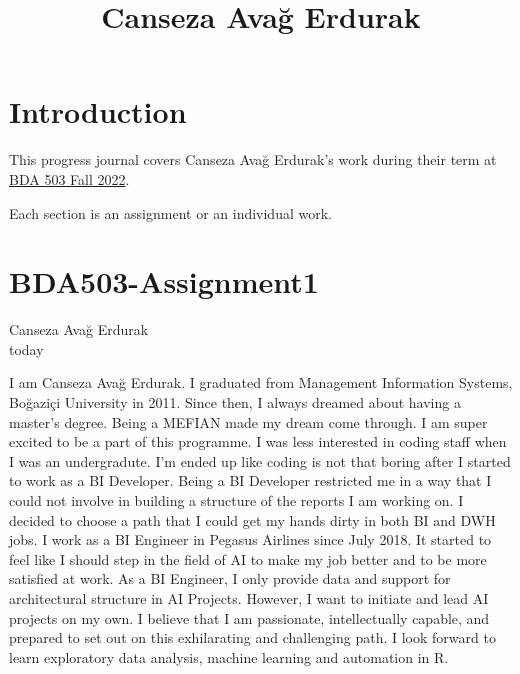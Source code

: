 \documentclass[
  letterpaper,
  DIV=11,
  numbers=noendperiod]{scrreprt}
\title{Canseza Avağ Erdurak}
\author{}
\date{}
\renewcommand*\contentsname{Table of contents}
\newcommand\contentsname{Table of contents}
\begin{document}
\maketitle
\ifdefined\Shaded\renewenvironment{Shaded}{\begin{tcolorbox}[borderline west={3pt}{0pt}{shadecolor}, boxrule=0pt, interior hidden, enhanced, breakable, frame hidden, sharp corners]}{\end{tcolorbox}}\fi

\renewcommand*\contentsname{Table of contents}
{
\hypersetup{linkcolor=}
\setcounter{tocdepth}{2}
\tableofcontents
}

\hypertarget{introduction}{%
\chapter*{Introduction}\label{introduction}}

This progress journal covers Canseza Avağ Erdurak's work during their
term at \href{https://mef-bda503.github.io/fall22/}{BDA 503 Fall 2022}.

Each section is an assignment or an individual work.


\hypertarget{bda503-assignment1}{%
\chapter{BDA503-Assignment1}\label{bda503-assignment1}}

Canseza Avağ Erdurak\\
today

\hfill\break

I am Canseza Avağ Erdurak. I graduated from Management Information
Systems, Boğaziçi University in 2011. Since then, I always dreamed about
having a master's degree. Being a MEFIAN made my dream come through. I
am super excited to be a part of this programme. I was less interested
in coding staff when I was an undergradute. I'm ended up like coding is
not that boring after I started to work as a BI Developer. Being a BI
Developer restricted me in a way that I could not involve in building a
structure of the reports I am working on. I decided to choose a path
that I could get my hands dirty in both BI and DWH jobs. I work as a BI
Engineer in Pegasus Airlines since July 2018. It started to feel like I
should step in the field of AI to make my job better and to be more
satisfied at work. As a BI Engineer, I only provide data and support for
architectural structure in AI Projects. However, I want to initiate and
lead AI projects on my own. I believe that I am passionate,
intellectually capable, and prepared to set out on this exhilarating and
challenging path. I look forward to learn exploratory data analysis,
machine learning and automation in R.
\end{document}
